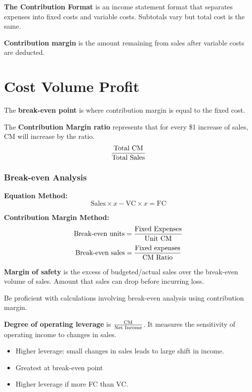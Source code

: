 \documentclass[english, 12pt]{article}
\begin{document}
\begin{defn}
\textbf{The Contribution Format} is an income statement format that separates expenses into fixed costs and variable costs. Subtotals vary but total cost is the same.
\end{defn}

\begin{defn}
\textbf{Contribution margin} is the amount remaining from sales after variable costs are deducted.
\end{defn}

\section{Cost Volume Profit}

\begin{defn}
The \textbf{break-even point} is where contribution margin is equal to the fixed cost.
\end{defn}

\begin{defn}
The \textbf{Contribution Margin ratio} represents that for every \$1 increase of sales, CM will increase by the ratio.
\[ \frac{\text{Total CM}}{\text{Total Sales}}\]
\end{defn}

\subsubsection*{Break-even Analysis}
\begin{mthd}
\textbf{Equation Method:}
\[ \text{Sales} \times x - \text{VC} \times x = \text{FC}\]
\end{mthd}
\begin{mthd}
\textbf{Contribution Margin Method:}
\[ \text{Break-even units} = \frac{\text{Fixed Expenses}}{\text{Unit CM}}\]
\[ \text{Break-even sales} = \frac{\text{Fixed expenses}}{\text{CM Ratio}}\]
\end{mthd}

\begin{defn}
\textbf{Margin of safety} is the excess of budgeted/actual sales over the break-even volume of sales. Amount that sales can drop before incurring loss.
\end{defn}

\begin{qte}
Be proficient with calculations involving break-even analysis using contribution margin.
\end{qte}

\begin{defn}
\textbf{Degree of operating leverage} is $\frac{\text{CM}}{\text{Net Income}}$. It measures the sensitivity of operating income to changes in sales.
\begin{itemize}
\item Higher leverage: small changes in sales leads to large shift in income.
\item Greatest at break-even point
\item Higher leverage if more FC than VC.
\end{itemize}
\end{defn}
\end{document}
